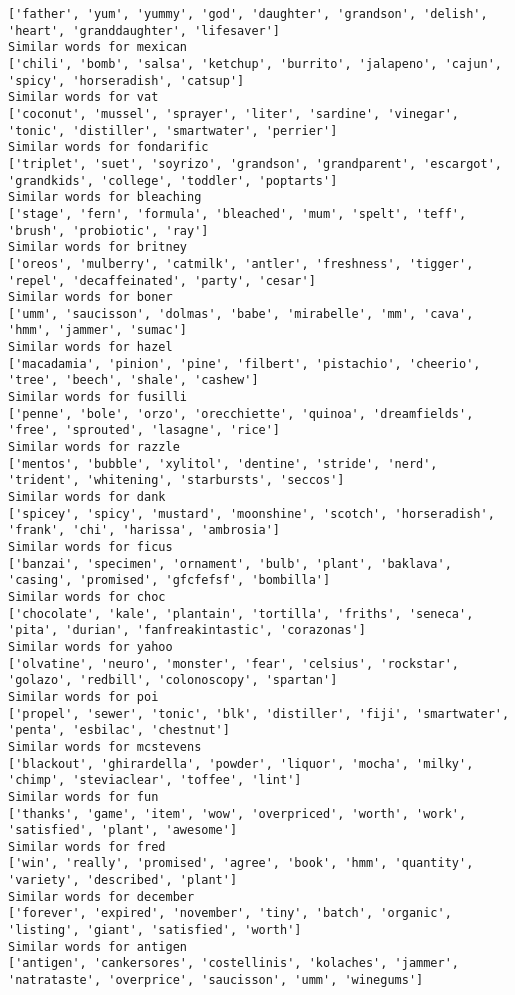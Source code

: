 \documentclass[11pt]{article}
\begin{document}
\begin{Verbatim}[commandchars=\\\{\}]
['father', 'yum', 'yummy', 'god', 'daughter', 'grandson', 'delish', 'heart', 'granddaughter', 'lifesaver']
Similar words for mexican
['chili', 'bomb', 'salsa', 'ketchup', 'burrito', 'jalapeno', 'cajun', 'spicy', 'horseradish', 'catsup']
Similar words for vat
['coconut', 'mussel', 'sprayer', 'liter', 'sardine', 'vinegar', 'tonic', 'distiller', 'smartwater', 'perrier']
Similar words for fondarific
['triplet', 'suet', 'soyrizo', 'grandson', 'grandparent', 'escargot', 'grandkids', 'college', 'toddler', 'poptarts']
Similar words for bleaching
['stage', 'fern', 'formula', 'bleached', 'mum', 'spelt', 'teff', 'brush', 'probiotic', 'ray']
Similar words for britney
['oreos', 'mulberry', 'catmilk', 'antler', 'freshness', 'tigger', 'repel', 'decaffeinated', 'party', 'cesar']
Similar words for boner
['umm', 'saucisson', 'dolmas', 'babe', 'mirabelle', 'mm', 'cava', 'hmm', 'jammer', 'sumac']
Similar words for hazel
['macadamia', 'pinion', 'pine', 'filbert', 'pistachio', 'cheerio', 'tree', 'beech', 'shale', 'cashew']
Similar words for fusilli
['penne', 'bole', 'orzo', 'orecchiette', 'quinoa', 'dreamfields', 'free', 'sprouted', 'lasagne', 'rice']
Similar words for razzle
['mentos', 'bubble', 'xylitol', 'dentine', 'stride', 'nerd', 'trident', 'whitening', 'starbursts', 'seccos']
Similar words for dank
['spicey', 'spicy', 'mustard', 'moonshine', 'scotch', 'horseradish', 'frank', 'chi', 'harissa', 'ambrosia']
Similar words for ficus
['banzai', 'specimen', 'ornament', 'bulb', 'plant', 'baklava', 'casing', 'promised', 'gfcfefsf', 'bombilla']
Similar words for choc
['chocolate', 'kale', 'plantain', 'tortilla', 'friths', 'seneca', 'pita', 'durian', 'fanfreakintastic', 'corazonas']
Similar words for yahoo
['olvatine', 'neuro', 'monster', 'fear', 'celsius', 'rockstar', 'golazo', 'redbill', 'colonoscopy', 'spartan']
Similar words for poi
['propel', 'sewer', 'tonic', 'blk', 'distiller', 'fiji', 'smartwater', 'penta', 'esbilac', 'chestnut']
Similar words for mcstevens
['blackout', 'ghirardella', 'powder', 'liquor', 'mocha', 'milky', 'chimp', 'steviaclear', 'toffee', 'lint']
Similar words for fun
['thanks', 'game', 'item', 'wow', 'overpriced', 'worth', 'work', 'satisfied', 'plant', 'awesome']
Similar words for fred
['win', 'really', 'promised', 'agree', 'book', 'hmm', 'quantity', 'variety', 'described', 'plant']
Similar words for december
['forever', 'expired', 'november', 'tiny', 'batch', 'organic', 'listing', 'giant', 'satisfied', 'worth']
Similar words for antigen
['antigen', 'cankersores', 'costellinis', 'kolaches', 'jammer', 'natrataste', 'overprice', 'saucisson', 'umm', 'winegums']

\end{Verbatim}
\end{document}
